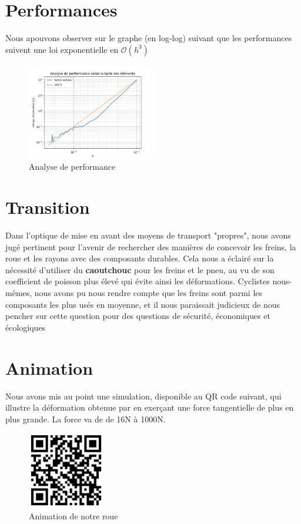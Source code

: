 \documentclass[conference]{IEEEtran}
\begin{document}
\section*{Performances}
Nous apouvons observer sur le graphe (en log-log) suivant que les performances suivent une loi exponentielle en $\mathcal{O}(h^3)$
\begin{figure}[h]
    \centering
    \includegraphics[width=0.5\textwidth]{../Figures/perf.png}
    \caption{Analyse de performance}
\end{figure}


\section*{Transition}
Dans l'optique de mise en avant des moyens de transport "propres", nous avons jugé pertinent pour l'avenir de rechercher des manières de concevoir les freins, la roue et les rayons avec des composants durables. Cela nous a éclairé sur la nécessité d'utiliser du \textbf{caoutchouc} pour les freins et le pneu, au vu de son coefficient de poisson plus élevé qui évite ainsi les déformations. Cyclistes nous-mêmes, nous avons pu nous rendre compte que les freins sont parmi les composants les plus usés en moyenne, et il nous paraissait judicieux de nous pencher sur cette question pour des questions de sécurité, économiques et écologiques
\section*{Animation}
Nous avons mis au point une simulation, disponible au QR code suivant, qui illustre la déformation obtenue par en exerçant une force tangentielle de plus en plus grande. La force va de de 16N à 1000N.
\begin{figure}[h]
    \centering
    \includegraphics[width=0.3\textwidth]{../Figures/QR.png}
    \caption{Animation de notre roue}
\end{figure}
\end{document}
